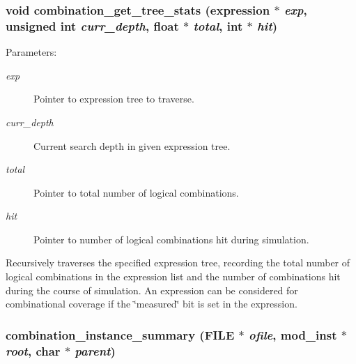 \subsubsection{\setlength{\rightskip}{0pt plus 5cm}void combination\_\-get\_\-tree\_\-stats ({\bf expression} $\ast$ {\em exp}, unsigned int {\em curr\_\-depth}, float $\ast$ {\em total}, int $\ast$ {\em hit})}\label{comb_8c_a6}


\begin{Desc}
\item[Parameters: ]\par
\begin{description}
\item[{\em 
exp}]Pointer to expression tree to traverse. \item[{\em 
curr\_\-depth}]Current search depth in given expression tree. \item[{\em 
total}]Pointer to total number of logical combinations. \item[{\em 
hit}]Pointer to number of logical combinations hit during simulation.\end{description}
\end{Desc}
Recursively traverses the specified expression tree, recording the total number of logical combinations in the expression list and the number of combinations hit during the course of simulation. An expression can be considered for combinational coverage if the \char`\"{}measured\char`\"{} bit is set in the expression. 
\subsubsection{ combination\_\-instance\_\-summary (FILE $\ast$ {\em ofile}, {\bf mod\_\-inst} $\ast$ {\em root}, char $\ast$ {\em parent})}\label{comb_8c_a8}


